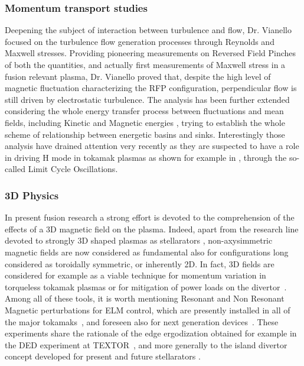 \documentclass[12pt,a4paper]{article}
\begin{document}
\subsubsection*{Momentum transport studies}
Deepening the subject of interaction between turbulence and flow,
Dr. Vianello focused on the turbulence flow generation processes
\cite{Vianello:2005p1976,Vianello:2005p2671}
through Reynolds and Maxwell stresses. Providing pioneering
measurements on Reversed Field Pinches of both the quantities, and
actually first measurements of Maxwell stress in a fusion relevant
plasma, Dr. Vianello proved that, despite the high level of magnetic
fluctuation characterizing the RFP configuration, perpendicular flow
is still driven by electrostatic turbulence. The analysis has been
further extended considering the whole energy transfer process between
fluctuations and mean fields, including Kinetic and Magnetic energies
\cite{Vianello:2006p1149}, trying to establish the whole scheme of
relationship between energetic basins and sinks. Interestingly those
analysis have drained attention very recently as they are suspected to
have a role in driving H mode in tokamak plasmas as shown for example
in \cite{Manz:2012jq,Manz:2012hh}, through the so-called Limit Cycle Oscillations.


\subsubsection*{3D Physics}
In present fusion research a strong effort is devoted to the
comprehension of the effects of a 3D magnetic field on the plasma.
Indeed, apart from the research line devoted to strongly 3D shaped
plasmas as stellarators \cite{Boozer:2009p4091}, non-axysimmetric
magnetic fields are now considered as fundamental also for
configurations long considered as toroidally symmetric, or
inherently 2D. In fact, 3D fields are considered for example as a
viable technique for momentum variation in torqueless tokamak
plasmas \cite{Garofalo:2009p4775,Nave:2010p4812} or for mitigation
of power loads on the divertor~\cite{Evans:2006p2554}. Among  all
of these tools, it is worth mentioning Resonant and Non Resonant
Magnetic perturbations for ELM control, which are presently
installed in all of the major
tokamaks~\cite{Evans:2006p2554,Suttrop:2011bp,Liang:2011ww,Kirk:2010p4626},
and foreseen also for next generation
devices~\cite{LoarteIAEAv:2012ui}. These experiments share the
rationale of the edge ergodization obtained for example in the DED
experiment at TEXTOR~\cite{Lehnen:2005ir}, and more generally to
the island divertor concept developed for present and future
stellarators \cite{0741-3335-44-11-306}.
\end{document}
